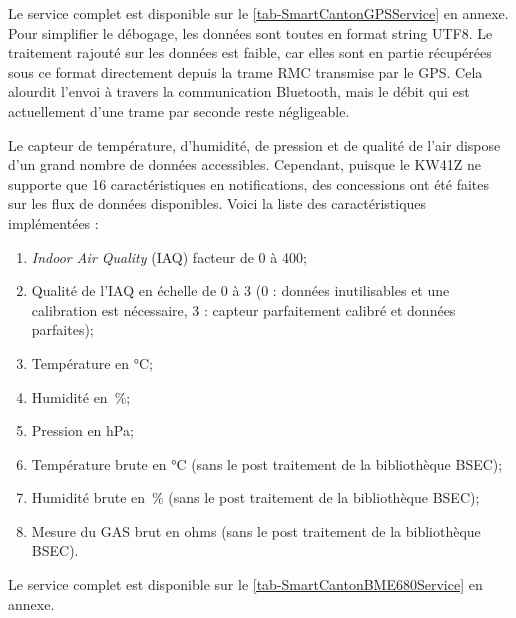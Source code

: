 Le service complet est disponible sur le \cref{tab-SmartCantonGPSService} en annexe. Pour simplifier le débogage, les données sont toutes en format string UTF8. Le traitement rajouté sur les données est faible, car elles sont en partie récupérées sous ce format directement depuis la trame RMC transmise par le GPS. Cela alourdit l'envoi à travers la communication Bluetooth, mais le débit qui est actuellement d'une trame par seconde reste négligeable.


\FloatBarrier
{}

Le capteur de température, d'humidité, de pression et de qualité de l'air dispose d'un grand nombre de données accessibles. Cependant, puisque le KW41Z ne supporte que 16 caractéristiques en notifications, des concessions ont été faites sur les flux de données disponibles. Voici la liste des caractéristiques implémentées : 
\begin{enumerate}
    \item \textit{Indoor Air Quality} (IAQ) facteur de 0 à 400;
    \item Qualité de l'IAQ en échelle de 0 à 3 (0 : données inutilisables et une calibration est nécessaire, 3 : capteur parfaitement calibré et données parfaites);
    \item Température en °C;
    \item Humidité en \,\%;
    \item Pression en hPa;
    \item Température brute en °C (sans le post traitement de la bibliothèque BSEC);
    \item Humidité brute en \,\% (sans le post traitement de la bibliothèque BSEC);
    \item Mesure du GAS brut en ohms (sans le post traitement de la bibliothèque BSEC).
\end{enumerate}

Le service complet est disponible sur le \cref{tab-SmartCantonBME680Service} en annexe.

\FloatBarrier
{}
\label{sec-software_ble_services_bno055}

